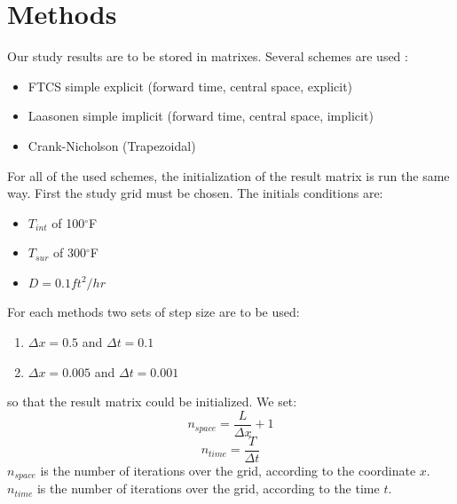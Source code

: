 \documentclass{article}
\begin{document}
        \section{Methods}
            Our study results are to be stored in matrixes.
            Several schemes are used :
            \begin{itemize}
                \item{FTCS simple explicit (forward time, central space, explicit)}
                \item{Laasonen simple implicit (forward time, central space, implicit)}
                \item{Crank-Nicholson (Trapezoidal)}
            \end{itemize}
            For all of the used schemes, the initialization of the result matrix is run the same way.
            First the study grid must be chosen. The initials conditions are:
            \begin{itemize}
                \item{$T_{int}$ of 100$^{\circ}$F}
                \item{$T_{sur}$ of 300$^{\circ}$F}
                \item{$D = 0.1 ft^{2}/hr$}
            \end{itemize}
            For each methods two sets of step size are to be used:
            \begin{enumerate}
                \item{$\Delta x = 0.5$ and $\Delta t = 0.1$} 
                \item{$\Delta x = 0.005$ and $\Delta t = 0.001$} 
            \end{enumerate}
            so that the result matrix could be initialized.
            We set:
            \begin{equation}
                n_{space} = \frac{L}{\Delta x} + 1
            \end{equation}
            \begin{equation}
                n_{time} = \frac{T}{\Delta t}
            \end{equation}
            $n_{space}$ is the number of iterations over the grid, according to the coordinate $x$. \\
            $n_{time}$ is the number of iterations over the grid, according to the time $t$. \\
            
\end{document}
